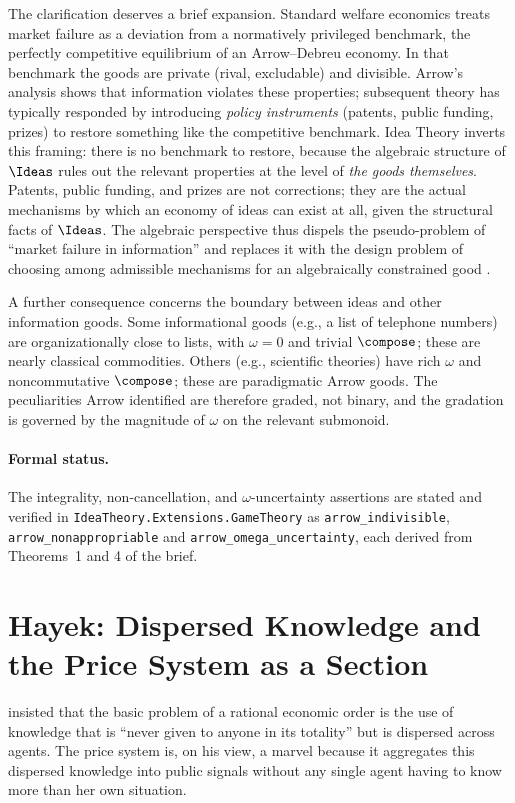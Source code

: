 The clarification deserves a brief expansion. Standard welfare economics
treats market failure as a deviation from a normatively privileged
benchmark, the perfectly competitive equilibrium of an Arrow--Debreu
economy. In that benchmark the goods are private (rival, excludable) and
divisible. Arrow's analysis shows that information violates these
properties; subsequent theory has typically responded by introducing
\emph{policy instruments} (patents, public funding, prizes) to restore
something like the competitive benchmark. Idea Theory inverts this
framing: there is no benchmark to restore, because the algebraic
structure of $\Ideas$ rules out the relevant properties at the level of
\emph{the goods themselves}. Patents, public funding, and prizes are not
corrections; they are the actual mechanisms by which an economy of
ideas can exist at all, given the structural facts of $\Ideas$. The
algebraic perspective thus dispels the pseudo-problem of ``market
failure in information'' and replaces it with the design problem of
choosing among admissible mechanisms for an algebraically constrained
good \citep{Arrow1962}.

A further consequence concerns the boundary between ideas and other
information goods. Some informational goods (e.g., a list of telephone
numbers) are organizationally close to lists, with $\omega = 0$ and
trivial $\compose$; these are nearly classical commodities. Others
(e.g., scientific theories) have rich $\omega$ and noncommutative
$\compose$; these are paradigmatic Arrow goods. The peculiarities Arrow
identified are therefore graded, not binary, and the gradation is
governed by the magnitude of $\omega$ on the relevant submonoid.

\paragraph{Formal status.} The integrality, non-cancellation, and
$\omega$-uncertainty assertions are stated and verified in
\texttt{IdeaTheory.Extensions.GameTheory} as
\texttt{arrow\_indivisible}, \texttt{arrow\_nonappropriable} and
\texttt{arrow\_omega\_uncertainty}, each derived from Theorems~1 and 4 of
the brief.

\section{Hayek: Dispersed Knowledge and the Price System as a Section}
\label{sec:hayek}

\citet{Hayek1945} insisted that the basic problem of a rational economic
order is the use of knowledge that is ``never given to anyone in its
totality'' but is dispersed across agents. The price system is, on his
view, a marvel because it aggregates this dispersed knowledge into
public signals without any single agent having to know more than her own
situation.

